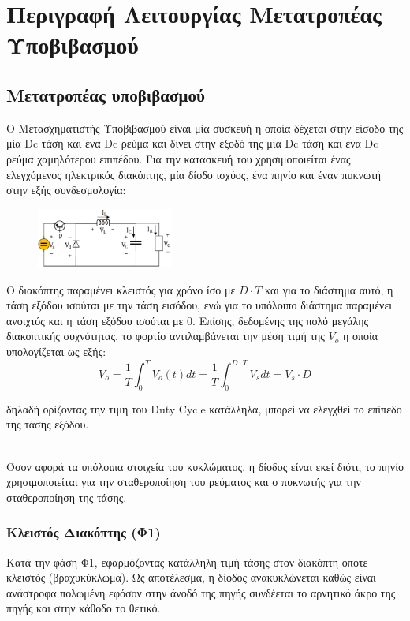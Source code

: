 \section{Περιγραφή Λειτουργίας Μετατροπέας Υποβιβασμού}

\subsection{Μετατροπέας υποβιβασμού}

\noindent
Ο Μετασχηματιστής Υποβιβασμού είναι μία συσκευή η οποία δέχεται στην είσοδο της μία Dc τάση και ένα Dc ρεύμα και δίνει στην έξοδό της μία Dc τάση και ένα Dc ρεύμα χαμηλότερου επιπέδου.  Για την κατασκευή του χρησιμοποιείται ένας ελεγχόμενος ηλεκτρικός διακόπτης, μία δίοδο ισχύος, ένα πηνίο και έναν πυκνωτή στην εξής συνδεσμολογία:
\begin{figure}[h]
	\centering
	\includegraphics[width=0.4\textwidth]{Images/buckConverter.png}
\end{figure}

\noindent
Ο διακόπτης παραμένει κλειστός για χρόνο ίσο με $D \cdot T$ και για το διάστημα αυτό, η τάση εξόδου ισούται με την τάση εισόδου, ενώ για το υπόλοιπο διάστημα παραμένει ανοιχτός και η τάση εξόδου ισούται με 0. Επίσης, δεδομένης της πολύ μεγάλης διακοπτικής συχνότητας, το φορτίο αντιλαμβάνεται την μέση τιμή της $V_o$ η οποία υπολογίζεται ως εξής:
\begin{equation}
	\bar{V_o} = \frac{1}{T} \int_{0}^{T} V_o(t) dt = \frac{1}{T} \int_{0}^{D\cdot T} V_s dt = V_s \cdot D	
\end{equation} 

δηλαδή ορίζοντας την τιμή του Duty Cycle κατάλληλα, μπορεί να ελεγχθεί το επίπεδο της τάσης εξόδου.

\noindent\\
Όσον αφορά τα υπόλοιπα στοιχεία του κυκλώματος, η δίοδος είναι εκεί διότι, το πηνίο χρησιμοποιείται για την σταθεροποίηση του ρεύματος και ο πυκνωτής για την σταθεροποίηση της τάσης.
\subsubsection{Κλειστός Διακόπτης (Φ1)}
\label{Phase_1}
\noindent
Κατά την φάση Φ1, εφαρμόζοντας κατάλληλη τιμή τάσης στον διακόπτη οπότε κλειστός (βραχυκύκλωμα). Ως αποτέλεσμα, η δίοδος ανακυκλώνεται καθώς είναι ανάστροφα πολωμένη εφόσον στην άνοδό της πηγής συνδέεται το αρνητικό άκρο της πηγής και στην κάθοδο το θετικό. 

